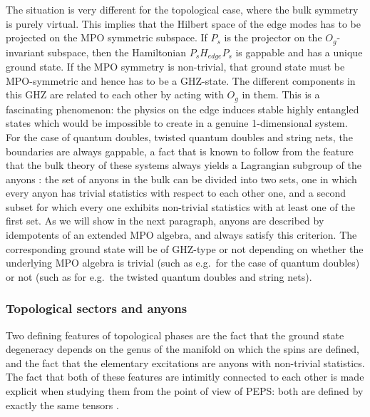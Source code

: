 \documentclass[rmp,aps,reprint,superscriptaddress,nobalancelastpage]{revtex4-1}
\begin{document}
    The situation is very different for the topological case, where the bulk symmetry is purely virtual. This implies that the Hilbert space of the edge modes has to be projected on the MPO symmetric subspace. If $P_s$ is the projector on the $O_g$-invariant subspace, then the Hamiltonian $P_sH_{edge}P_s$ is gappable and has a unique ground state. If the MPO symmetry is non-trivial, that ground state must be MPO-symmetric and hence has to be a GHZ-state. The different components in this GHZ are related to each other by acting with $O_g$ in them. This is a fascinating phenomenon: the physics on the edge induces stable highly entangled states which would be impossible to create in a genuine 1-dimensional system. For the case of quantum doubles, twisted quantum doubles and string nets, the boundaries are always gappable, a fact that is known to follow from the feature that the bulk theory of these systems always yields a Lagrangian subgroup of the anyons \cite{kitaev:gapped-boundaries,levin:Lagrangian}:  the set of  anyons in the bulk can be divided into two sets, one in which every anyon has trivial statistics with respect to each other one, and a second subset for which every one exhibits non-trivial statistics with at least one of the first set. As we will show in the next paragraph, anyons are described by idempotents of an extended MPO algebra, and always satisfy this criterion. The corresponding ground state will be of GHZ-type or not depending on whether the underlying MPO algebra is trivial (such as e.g.\ for the case of quantum doubles) or not (such as for e.g.\ the twisted quantum doubles and string nets).




    \subsubsection{Topological sectors and anyons} \label{tsaa}
    Two defining features of topological phases are the fact that the ground state degeneracy depends on the genus of the manifold on which the spins are defined, and the fact that the elementary excitations are anyons with non-trivial statistics. The fact that both of these features are intimitly connected to each other is made explicit when studying them from the point of view of PEPS: both are defined by exactly the same tensors \cite{schuch:peps-sym,bultinck:mpo-anyons}.
\end{document}
